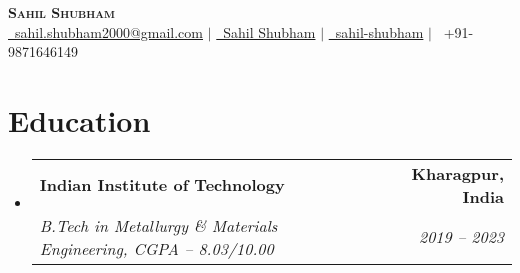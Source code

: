 \documentclass[letterpaper,11pt]{article}
\makeatletter
\newcommand{\resumeItem}[1]{
  \item\small{
    {#1 \vspace{-2pt}}
  }
}
\newcommand{\resumeSubheading}[4]{
  \vspace{-2pt}\item
    \begin{tabular*}{1.0\textwidth}[t]{l@{\extracolsep{\fill}}r}
      \textbf{#1} & \textbf{\small #2} \\
      \textit{\small#3} & \textit{\small #4} \\
    \end{tabular*}\vspace{-7pt}
}
\newcommand{\resumeSubSubheading}[2]{
    \item
    \begin{tabular*}{0.97\textwidth}{l@{\extracolsep{\fill}}r}
      \textit{\small#1} & \textit{\small #2} \\
    \end{tabular*}\vspace{-7pt}
}
\newcommand{\resumeSubHeadingListStart}{\begin{itemize}[leftmargin=0.0in, label={}]}
\newcommand{\resumeSubHeadingListEnd}{\end{itemize}}
\newcommand{\resumeItemListStart}{\begin{itemize}}
\newcommand{\resumeItemListEnd}{\end{itemize}\vspace{-5pt}}
\makeatother
\begin{document}
\begin{center}
  \textbf{\Huge \scshape Sahil Shubham} \\ \vspace{1pt}
  \small \href{mailto:sahil.shubham2000@gmail.com}{\faEnvelope \, sahil.shubham2000@gmail.com} $|$ 
    \href{https://www.linkedin.com/in/sahil-shubham-3599731a1/}{\faLinkedin \, Sahil Shubham} $|$
    \href{https://github.com/sahil-shubham}{\faGithub \, sahil-shubham} $|$
    {\faPhone \, +91-9871646149}
\end{center}


\section{Education}
\resumeSubHeadingListStart
\resumeSubheading
{Indian Institute of Technology}{Kharagpur, India}
{B.Tech in Metallurgy \& Materials Engineering, CGPA -- 8.03/10.00} {2019 -- 2023}
\resumeSubHeadingListEnd







\end{document}
